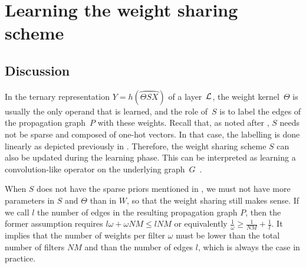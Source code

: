 \section{Learning the weight sharing scheme}
\label{sec:learningscheme}

\subsection{Discussion}

In the ternary representation $Y = h(\wideparen{\Theta S X})$ of a layer~$\mathcal{L}$, the weight kernel~$\Theta$ is usually the only operand that is learned, and the role of~$S$ is to label the edges of the propagation graph~$P$ with these weights. Recall that, as noted after , $S$ needs not be sparse and composed of one-hot vectors. In that case, the labelling is done linearly as depicted previously in . Therefore, the weight sharing scheme $S$ can also be updated during the learning phase. This can be interpreted as learning a convolution-like operator on the underlying graph~$G$~\citep{vialatte2017learning}.

\begin{remark}
When $S$ does not have the sparse priors mentioned in , we must not have more parameters in $S$ and $\Theta$ than in $W$, so that the weight sharing still makes sense. If we call $l$ the number of edges in the resulting propagation graph $P$, then the former assumption requires $l\omega + \omega NM \leq lNM$ or equivalently $\frac{1}{\omega} \geq \frac{1}{NM} + \frac{1}{l}$. It implies that the number of weights per filter $\omega$ must be lower than the total number of filters $NM$ and than the number of edges $l$, which is always the case in practice.
\end{remark}



